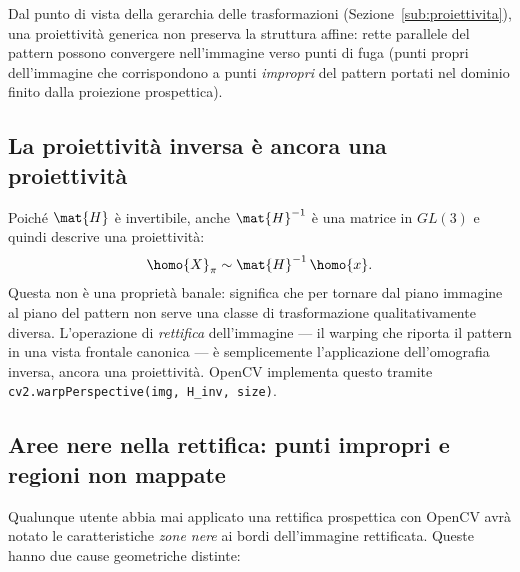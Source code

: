 Dal punto di vista della gerarchia delle trasformazioni
(Sezione~\ref{sub:proiettivita}), una proiettività generica
non preserva la struttura affine: rette parallele del pattern
possono convergere nell'immagine verso punti di fuga (punti propri
dell'immagine che corrispondono a punti \emph{impropri} del pattern
portati nel dominio finito dalla proiezione prospettica).

\subsection{La proiettività inversa è ancora una proiettività}
\label{sub:inversa_proiettivita}

Poiché \(\mat{H}\) è invertibile, anche \(\mat{H}^{-1}\) è una matrice
in \(GL(3)\) e quindi descrive una proiettività:
\[
  \homo{X}_{\pi} \sim \mat{H}^{-1}\,\homo{x}.
\]
Questa non è una proprietà banale: significa che per tornare dal piano
immagine al piano del pattern non serve una classe di trasformazione
qualitativamente diversa. L'operazione di \emph{rettifica} dell'immagine
— il warping che riporta il pattern in una vista frontale canonica —
è semplicemente l'applicazione dell'omografia inversa, ancora una
proiettività. OpenCV implementa questo tramite
\texttt{cv2.warpPerspective(img, H\_inv, size)}.

\subsection{Aree nere nella rettifica: punti impropri e regioni non mappate}
\label{sub:aree_nere}

Qualunque utente abbia mai applicato una rettifica prospettica
con OpenCV avrà notato le caratteristiche \emph{zone nere} ai bordi
dell'immagine rettificata. Queste hanno due cause geometriche distinte:

